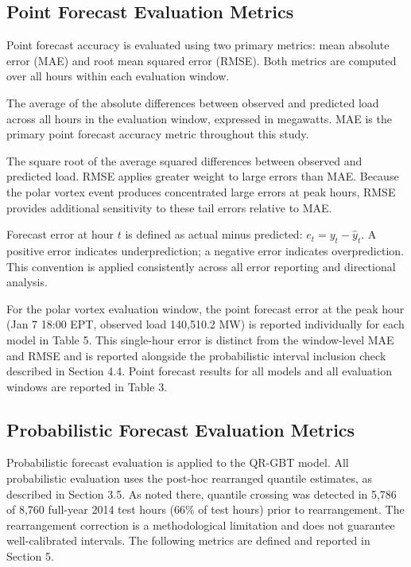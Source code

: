 \documentclass[12pt,a4paper]{article}
\begin{document}
\subsection{Point Forecast Evaluation Metrics}
Point forecast accuracy is evaluated using two primary metrics: mean absolute error (MAE) and root mean squared error (RMSE). Both metrics are computed over all hours within each evaluation window.

\begin{description}[leftmargin=!, labelwidth=3.2cm, itemsep=4pt]
\item[MAE] The average of the absolute differences between observed and predicted load across all hours in the evaluation window, expressed in megawatts. MAE is the primary point forecast accuracy metric throughout this study.
\item[RMSE] The square root of the average squared differences between observed and predicted load. RMSE applies greater weight to large errors than MAE. Because the polar vortex event produces concentrated large errors at peak hours, RMSE provides additional sensitivity to these tail errors relative to MAE.
\item[Error convention] Forecast error at hour $t$ is defined as actual minus predicted: $e_t = y_t - \hat{y}_t$. A positive error indicates underprediction; a negative error indicates overprediction. This convention is applied consistently across all error reporting and directional analysis.
\item[Event-peak error] For the polar vortex evaluation window, the point forecast error at the peak hour (Jan 7 18:00 EPT, observed load 140,510.2 MW) is reported individually for each model in Table 5. This single-hour error is distinct from the window-level MAE and RMSE and is reported alongside the probabilistic interval inclusion check described in Section 4.4.
Point forecast results for all models and all evaluation windows are reported in Table 3.
\end{description}
\subsection{Probabilistic Forecast Evaluation Metrics}
Probabilistic forecast evaluation is applied to the QR-GBT model. All probabilistic evaluation uses the post-hoc rearranged quantile estimates, as described in Section 3.5. As noted there, quantile crossing was detected in 5,786 of 8,760 full-year 2014 test hours (66\% of test hours) prior to rearrangement. The rearrangement correction is a methodological limitation and does not guarantee well-calibrated intervals.
The following metrics are defined and reported in Section 5.
\end{document}
